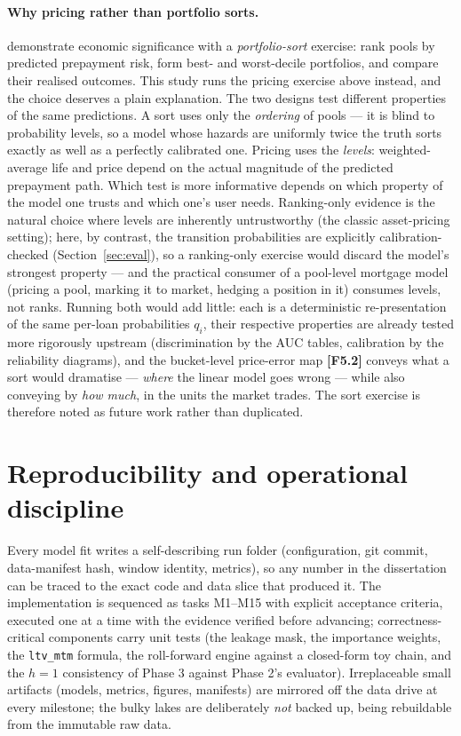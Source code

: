 \documentclass[11pt,a4paper]{article}
\newcommand{\code}[1]{\texttt{#1}}
\newcommand{\artifact}[1]{\textbf{[#1]}}
\begin{document}
\paragraph{Why pricing rather than portfolio sorts.} \citet{sirignano2021} demonstrate economic significance with a \emph{portfolio-sort} exercise: rank pools by predicted prepayment risk, form best- and worst-decile portfolios, and compare their realised outcomes. This study runs the pricing exercise above instead, and the choice deserves a plain explanation. The two designs test different properties of the same predictions. A sort uses only the \emph{ordering} of pools --- it is blind to probability levels, so a model whose hazards are uniformly twice the truth sorts exactly as well as a perfectly calibrated one. Pricing uses the \emph{levels}: weighted-average life and price depend on the actual magnitude of the predicted prepayment path. Which test is more informative depends on which property of the model one trusts and which one's user needs. Ranking-only evidence is the natural choice where levels are inherently untrustworthy (the classic asset-pricing setting); here, by contrast, the transition probabilities are explicitly calibration-checked (Section~\ref{sec:eval}), so a ranking-only exercise would discard the model's strongest property --- and the practical consumer of a pool-level mortgage model (pricing a pool, marking it to market, hedging a position in it) consumes levels, not ranks. Running both would add little: each is a deterministic re-presentation of the same per-loan probabilities $q_i$, their respective properties are already tested more rigorously upstream (discrimination by the AUC tables, calibration by the reliability diagrams), and the bucket-level price-error map \artifact{F5.2} conveys what a sort would dramatise --- \emph{where} the linear model goes wrong --- while also conveying by \emph{how much}, in the units the market trades. The sort exercise is therefore noted as future work rather than duplicated.

\section{Reproducibility and operational discipline}\label{sec:repro}

Every model fit writes a self-describing run folder (configuration, git commit, data-manifest hash, window identity, metrics), so any number in the dissertation can be traced to the exact code and data slice that produced it. The implementation is sequenced as tasks M1--M15 with explicit acceptance criteria, executed one at a time with the evidence verified before advancing; correctness-critical components carry unit tests (the leakage mask, the importance weights, the \code{ltv\_mtm} formula, the roll-forward engine against a closed-form toy chain, and the $h{=}1$ consistency of Phase 3 against Phase 2's evaluator). Irreplaceable small artifacts (models, metrics, figures, manifests) are mirrored off the data drive at every milestone; the bulky lakes are deliberately \emph{not} backed up, being rebuildable from the immutable raw data.
\end{document}
